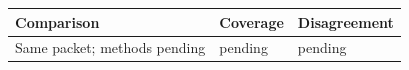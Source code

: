 \begin{tabular}{lll}
Comparison & Coverage & Disagreement \\
\hline
Same packet; methods pending & pending & pending \\
\end{tabular}
